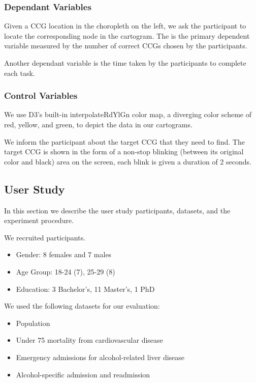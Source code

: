 \subsubsection{Dependant Variables}

 Given a CCG location in the choropleth on the left, we ask the participant to locate the corresponding node in the cartogram. The is the primary dependent variable measured by the number of correct CCGs chosen by the participants.

 Another dependant variable is the time taken by the participants to complete each task.

\subsubsection{Control Variables}
 We use D3's built-in interpolateRdYlGn color map, a diverging color scheme of red, yellow, and green, to depict the data in our cartograms.

 We inform the participant about the target CCG that they need to find. The target CCG is shown in the form of a non-stop blinking (between its original color and black) area on the screen, each blink is given a duration of 2 seconds.

\subsection{User Study}
In this section we describe the user study participants, datasets, and the experiment procedure.

 We recruited \pCount participants.

\begin{itemize}
    \item Gender:  8 females and 7 males
    \item Age Group:   18-24 (7), 25-29 (8)
    \item Education:   3 Bachelor's, 11 Master's, 1 PhD
\end{itemize}

 We used the following datasets for our evaluation:

\begin{itemize}
    \item Population
    \item Under 75 mortality from cardiovascular disease
    \item Emergency admissions for alcohol-related liver disease
    \item Alcohol-specific admission and readmission
\end{itemize}

